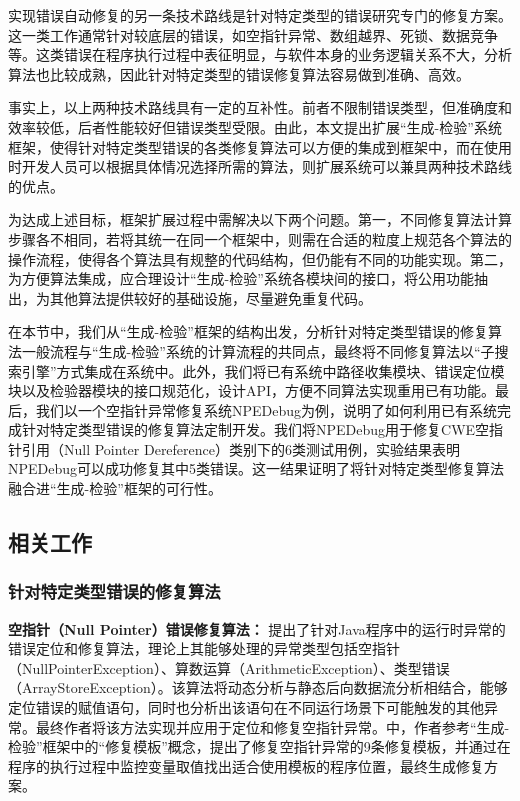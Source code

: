 实现错误自动修复的另一条技术路线是针对特定类型的错误研究专门的修复方案。这一类工作通常针对较底层的错误，如空指针异常、数组越界、死锁、数据竞争等。这类错误在程序执行过程中表征明显，与软件本身的业务逻辑关系不大，分析算法也比较成熟，因此针对特定类型的错误修复算法容易做到准确、高效。

事实上，以上两种技术路线具有一定的互补性。前者不限制错误类型，但准确度和效率较低，后者性能较好但错误类型受限。由此，本文提出扩展“生成-检验”系统框架，使得针对特定类型错误的各类修复算法可以方便的集成到框架中，而在使用时开发人员可以根据具体情况选择所需的算法，则扩展系统可以兼具两种技术路线的优点。

为达成上述目标，框架扩展过程中需解决以下两个问题。第一，不同修复算法计算步骤各不相同，若将其统一在同一个框架中，则需在合适的粒度上规范各个算法的操作流程，使得各个算法具有规整的代码结构，但仍能有不同的功能实现。第二，为方便算法集成，应合理设计“生成-检验”系统各模块间的接口，将公用功能抽出，为其他算法提供较好的基础设施，尽量避免重复代码。

在本节中，我们从“生成-检验”框架的结构出发，分析针对特定类型错误的修复算法一般流程与“生成-检验”系统的计算流程的共同点，最终将不同修复算法以“子搜索引擎”方式集成在系统中。此外，我们将已有系统中路径收集模块、错误定位模块以及检验器模块的接口规范化，设计API，方便不同算法实现重用已有功能。最后，我们以一个空指针异常修复系统NPEDebug为例，说明了如何利用已有系统完成针对特定类型错误的修复算法定制开发。我们将NPEDebug用于修复CWE空指针引用（Null Pointer Dereference）类别下的6类测试用例，实验结果表明NPEDebug可以成功修复其中5类错误。这一结果证明了将针对特定类型修复算法融合进“生成-检验”框架的可行性。


\subsection{相关工作}%

\subsubsection{针对特定类型错误的修复算法}

\textbf{空指针（Null Pointer）错误修复算法：}
\cite{Sinha:2009:FLR:1572272.1572291}提出了针对Java程序中的运行时异常的错误定位和修复算法，理论上其能够处理的异常类型包括空指针（NullPointerException）、算数运算（ArithmeticException）、类型错误（ArrayStoreException）。该算法将动态分析与静态后向数据流分析相结合，能够定位错误的赋值语句，同时也分析出该语句在不同运行场景下可能触发的其他异常。最终作者将该方法实现并应用于定位和修复空指针异常。\cite{DBLP:journals/corr/CornuDSM15}中，作者参考“生成-检验”框架中的“修复模板”概念，提出了修复空指针异常的9条修复模板，并通过在程序的执行过程中监控变量取值找出适合使用模板的程序位置，最终生成修复方案。

